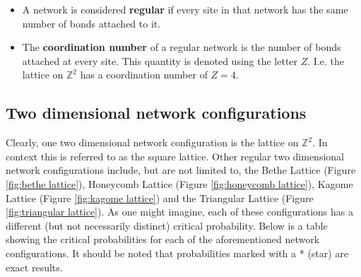 \begin{itemize}
  \item A network is considered \textbf{regular} if every site in that network has the same number of bonds attached to it.
  \item The \textbf{coordination number} of a regular network is the number of bonds attached at every site. This quantity is denoted using the letter $Z$. I.e. the lattice on
    $\mathbb{Z}^2$ has a coordination number of $Z = 4$.
\end{itemize}



\subsection*{Two dimensional network configurations}
Clearly, one two dimensional network configuration is the lattice on $\mathbb{Z}^2$. In context this is referred to as the square lattice. Other regular two dimensional network configurations include, but are not limited to, the Bethe Lattice (Figure \ref{fig:bethe lattice}), Honeycomb
Lattice (Figure \ref{fig:honeycomb lattice}), Kagome Lattice (Figure \ref{fig:kagome lattice}) and the Triangular Lattice (Figure \ref{fig:triangular lattice}). As one might
imagine, each of these configurations has a different (but not necessarily distinct) critical probability. Below is a table showing the critical probabilities for each of the
aforementioned network configurations. It should be noted that probabilities marked with a * (star) are exact results.

